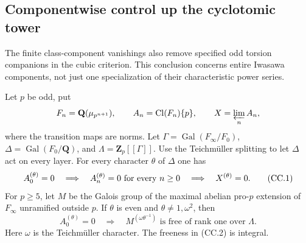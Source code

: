 \subsection{Componentwise control up the cyclotomic tower}
\label{sec:componentwise-iwasawa-control}

The finite class-component vanishings also remove specified odd torsion
companions in the cubic criterion. This conclusion concerns entire
Iwasawa components, not just one specialization of their characteristic
power series.

\begin{proposition}
\label{prop:componentwise-iwasawa-control}
Let $p$ be odd, put
\[
 F_n=\mathbf Q(\mu_{p^{n+1}}),\qquad
 A_n=\operatorname{Cl}(F_n)\{p\},\qquad
 X=\varprojlim_n A_n,
\]
where the transition maps are norms. Let
$\Gamma=\operatorname{Gal}(F_\infty/F_0)$,
$\Delta=\operatorname{Gal}(F_0/\mathbf Q)$, and
$\Lambda=\mathbf Z_p[[\Gamma]]$. Use the Teichm\"uller splitting
to let $\Delta$ act on every layer. For every character $\theta$ of
$\Delta$ one has
\[
 A_0^{(\theta)}=0
 \quad\Longrightarrow\quad
 A_n^{(\theta)}=0\ \hbox{for every }n\geq0
 \quad\Longrightarrow\quad X^{(\theta)}=0.
 \tag{CC.1}
\]
For $p\geq5$, let $M$ be the Galois group of the maximal abelian
pro-$p$ extension of $F_\infty$ unramified outside $p$.
If $\theta$ is even and $\theta\ne1,\omega^2$, then
\[
 A_0^{(\theta)}=0
 \quad\Longrightarrow\quad
 M^{(\omega\theta^{-1})}\text{ is free of rank one over }\Lambda.
 \tag{CC.2}
\]
Here $\omega$ is the Teichm\"uller character. The freeness in
(CC.2) is integral.
\end{proposition}

